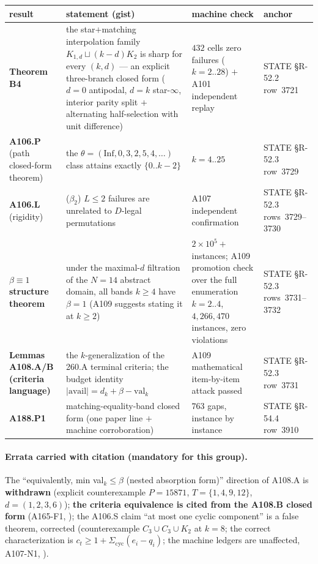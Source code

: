 \begin{center}
\begin{tabular}{p{}p{}p{}p{}}
\hline
result & statement (gist) & machine check & anchor \\
\hline
\textbf{Theorem B4} & the star$+$matching interpolation family
$K_{1,d}\sqcup(k-d)K_2$ is sharp for every $(k,d)$ --- an explicit
three-branch closed form ($d=0$ antipodal, $d=k$ star-$\infty$, interior
parity split $+$ alternating half-selection with unit difference) &
$432$ cells zero failures ($k=2..28$) $+$ A101 independent replay & STATE
\S R-52.2 row~3721 \\
\textbf{A106.P} (path closed-form theorem) & the
$\theta=(\mathrm{Inf},0,3,2,5,4,\dots)$ class attains exactly
$\{0..k-2\}$ & $k=4..25$ & STATE \S R-52.3 row~3729 \\
\textbf{A106.L} (rigidity) & ($\beta_2$) $L\le2$ failures are unrelated to
$D$-legal permutations & A107 independent confirmation & STATE \S R-52.3
rows~3729--3730 \\
\textbf{$\beta\equiv1$ structure theorem} & under the maximal-$d$ filtration
of the $N=14$ abstract domain, all bands $k\ge4$ have $\beta=1$ (A109
suggests stating it at $k\ge2$) & $2\times10^5+$ instances; A109 promotion
check over the full enumeration $k=2..4$, $4{,}266{,}470$ instances, zero
violations & STATE \S R-52.3 rows~3731--3732 \\
\textbf{Lemmas A108.A/B (criteria language)} & the $k$-generalization of the
260.A terminal criteria; the budget identity
$\lvert\mathrm{avail}\rvert=d_k+\beta-\mathrm{val}_k$ & A109 mathematical
item-by-item attack passed & STATE \S R-52.3 row~3731 \\
\textbf{A188.P1} & matching-equality-band closed form (one paper line $+$
machine corroboration) & $763$ gaps, instance by instance & STATE \S R-54.4
row~3910 \\
\hline
\end{tabular}
\end{center}

\paragraph{Errata carried with citation (mandatory for this group).} The
``equivalently, min val$_k\le\beta$ (nested absorption form)'' direction of
A108.A is \textbf{withdrawn} (explicit counterexample $P=15871$,
$T=\{1,4,9,12\}$, $d=(1,2,3,6)$); \textbf{the criteria equivalence is cited
from the A108.B closed form} (A165-F1, ); the
A106.S claim ``at most one cyclic component'' is a false theorem, corrected
(counterexample $C_3\cup C_3\cup K_2$ at $k=8$; the correct characterization
is $c_t\ge1+\Sigma_{\mathrm{cyc}}(e_i-q_i)$; the machine ledgers are
unaffected, A107-N1, ).

